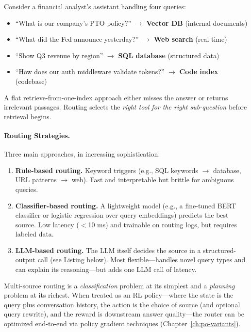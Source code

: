 Consider a financial analyst’s assistant handling four queries:

\begin{itemize}
  \item ``What is our company’s PTO policy?'' $\rightarrow$ \textbf{Vector DB} (internal documents)
  \item ``What did the Fed announce yesterday?'' $\rightarrow$ \textbf{Web search} (real-time)
  \item ``Show Q3 revenue by region'' $\rightarrow$ \textbf{SQL database} (structured data)
  \item ``How does our auth middleware validate tokens?'' $\rightarrow$ \textbf{Code index} (codebase)
\end{itemize}

A flat retrieve-from-one-index approach either misses the answer or returns irrelevant passages. Routing selects the \emph{right tool for the right sub-question} before retrieval begins.

\paragraph{Routing Strategies.}
\label{routing-strategies.}

Three main approaches, in increasing sophistication:

\begin{enumerate}
  \item \textbf{Rule-based routing.} Keyword triggers (e.g., SQL keywords $\rightarrow$ database, URL patterns $\rightarrow$ web). Fast and interpretable but brittle for ambiguous queries.
  \item \textbf{Classifier-based routing.} A lightweight model (e.g., a fine-tuned BERT classifier or logistic regression over query embeddings) predicts the best source. Low latency ($<$10 ms) and trainable on routing logs, but requires labeled data.
  \item \textbf{LLM-based routing.} The LLM itself decides the source in a structured-output call (see Listing below). Most flexible---handles novel query types and can explain its reasoning---but adds one LLM call of latency.
\end{enumerate}

\begin{intuitionbox}
Multi-source routing is a \emph{classification} problem at its simplest and a \emph{planning} problem at its richest. When treated as an RL policy---where the state is the query plus conversation history, the action is the choice of source (and optional query rewrite), and the reward is downstream answer quality---the router can be optimized end-to-end via policy gradient techniques (Chapter~\ref{ch:po-variants}).
\end{intuitionbox}

